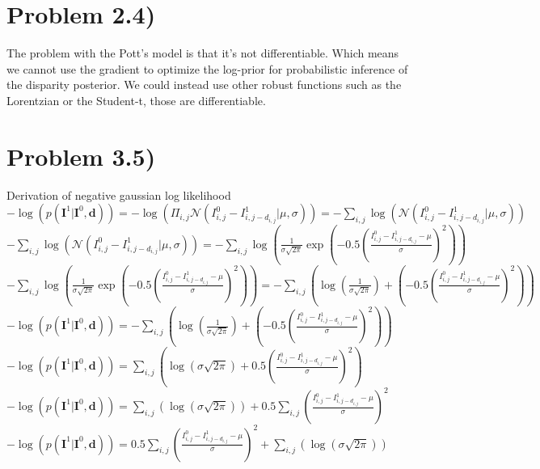 \documentclass[11pt]{article} %
\begin{document}
	\section*{Problem 2.4)}
	The problem with the Pott's model is that it's not differentiable. Which means we cannot use the gradient to optimize the log-prior for probabilistic inference of the disparity posterior. We could instead use other robust functions such as the Lorentzian or the Student-t, those are differentiable.
 
 	\newpage
 	\section*{Problem 3.5)}
 	Derivation of negative gaussian log likelihood\\
 	$- \log \left( p(\textbf{I}^1 \vert \textbf{I}^0, \textbf{d})\right) = - \log \left( \Pi_{i,j} \mathcal{N}\left( I^0 _{i,j} - I^1 _{i,j - d_{i,j}} \lvert \mu , \sigma \right) \right) = - \sum_{i,j} \log \left(\mathcal{N}\left( I^0 _{i,j} - I^1 _{i,j - d_{i,j}} \lvert \mu , \sigma \right)\right)$\\
 	$- \sum_{i,j} \log \left(\mathcal{N}\left( I^0 _{i,j} - I^1 _{i,j - d_{i,j}} \lvert \mu , \sigma \right)\right) = - \sum_{i,j} \log \left( \frac{1}{\sigma \sqrt{2\pi}} \exp\left(-0.5 \left(\frac{I^0 _{i,j} - I^1 _{i,j - d_{i,j}} - \mu}{\sigma}\right)^2\right)\right)$\\
  	$- \sum_{i,j} \log \left( \frac{1}{\sigma \sqrt{2\pi}} \exp\left(-0.5 \left(\frac{I^0 _{i,j} - I^1 _{i,j - d_{i,j}} - \mu}{\sigma}\right)^2\right)\right) = - \sum_{i,j} \left( \log \left( \frac{1}{\sigma \sqrt{2\pi}}\right) + \left(-0.5 \left(\frac{I^0 _{i,j} - I^1 _{i,j - d_{i,j}} - \mu}{\sigma}\right)^2\right)\right)$\\
  	$- \log \left( p(\textbf{I}^1 \vert \textbf{I}^0, \textbf{d})\right) = - \sum_{i,j} \left( \log \left( \frac{1}{\sigma \sqrt{2\pi}}\right) + \left(-0.5 \left(\frac{I^0 _{i,j} - I^1 _{i,j - d_{i,j}} - \mu}{\sigma}\right)^2\right)\right)$\\
    $- \log \left( p(\textbf{I}^1 \vert \textbf{I}^0, \textbf{d})\right) = \sum_{i,j} \left(  \log \left( \sigma \sqrt{2\pi} \right) + 0.5 \left(\frac{I^0 _{i,j} - I^1 _{i,j - d_{i,j}} - \mu}{\sigma}\right)^2\right)$\\
    $- \log \left( p(\textbf{I}^1 \vert \textbf{I}^0, \textbf{d})\right) = \sum_{i,j} \left(  \log \left( \sigma \sqrt{2\pi} \right)\right) + 0.5 \sum_{i,j} \left(\frac{I^0 _{i,j} - I^1 _{i,j - d_{i,j}} - \mu}{\sigma}\right)^2$\\
    $- \log \left( p(\textbf{I}^1 \vert \textbf{I}^0, \textbf{d})\right) = 0.5 \sum_{i,j} \left(\frac{I^0 _{i,j} - I^1 _{i,j - d_{i,j}} - \mu}{\sigma}\right)^2 + \sum_{i,j} \left(  \log \left( \sigma \sqrt{2\pi} \right)\right)$\\
\end{document}
